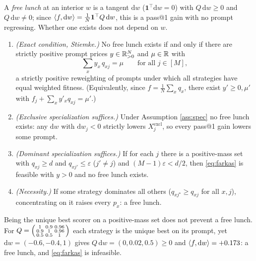 \begin{theorem}
\label{thm:nfl}
A \emph{free lunch} at an interior $w$ is a tangent $\mathrm{d}w$
($\mathbf 1^\top\mathrm{d}w=0$) with $Q\,\mathrm{d}w\ge0$ and $Q\,\mathrm{d}w\ne0$;
since $\langle f, \mathrm{d}w\rangle=\tfrac1N\mathbf 1^\top Q\,\mathrm{d}w$, this is a
pass@1 gain with no prompt regressing. Whether one exists does not depend on $w$.
\begin{enumerate}
\item[(a)] \emph{(Exact condition, Stiemke.)} No free lunch exists if and only if
there are strictly positive prompt prices $y\in\mathbb{R}^{N}_{>0}$ and $\mu\in\mathbb{R}$ with
\begin{equation}
\label{eq:farkas}
\sum_x y_x\,q_{xj}=\mu\qquad\text{for all } j\in[M],
\end{equation}
a strictly positive reweighting of prompts under which all strategies have equal
weighted fitness. (Equivalently, since $f=\tfrac1N\sum_x q_x$, there exist
$y'\ge0,\mu'$ with $f_j+\sum_x y'_x q_{xj}=\mu'$.)
\item[(b)] \emph{(Exclusive specialization suffices.)} Under Assumption
\ref{ass:spec} no free lunch exists: any $\mathrm{d}w$ with $\mathrm{d}w_j<0$
strictly lowers $X_j^{\mathrm{excl}}$, so every pass@1 gain lowers some prompt.
\item[(b$'$)] \emph{(Dominant specialization suffices.)} If for each $j$ there is a
positive-mass set with $q_{xj}\ge d$ and $q_{xj'}\le\varepsilon$ ($j'\ne j$) and
$(M-1)\varepsilon<d/2$, then \eqref{eq:farkas} is feasible with $y>0$ and no free
lunch exists.
\item[(c)] \emph{(Necessity.)} If some strategy dominates all others
($q_{xj^\star}\ge q_{xj}$ for all $x,j$), concentrating on it raises every $p_x$:
a free lunch.
\end{enumerate}
\end{theorem}

\begin{proposition}
\label{prop:uniquebest}
Being the unique best scorer on a positive-mass set does not prevent a free lunch.
For $Q=\begin{psmallmatrix}1&0.9&0.96\\0.9&1&0.96\\0.5&0.5&1\end{psmallmatrix}$
each strategy is the unique best on its prompt, yet
$\mathrm{d}w=(-0.6,-0.4,1)$ gives $Q\,\mathrm{d}w=(0,0.02,0.5)\ge0$ and
$\langle f, \mathrm{d}w\rangle=+0.173$: a free lunch, and \eqref{eq:farkas} is infeasible.
\end{proposition}

